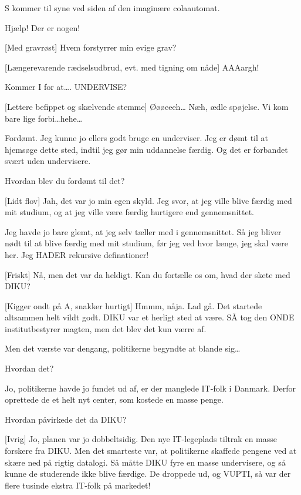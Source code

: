 \documentclass[danish]{article}
\begin{document}
\begin{sketch}
\scene S kommer til syne ved siden af den imaginære colaautomat.

 Hjælp! Der er nogen! 

[Med gravrøst] Hvem forstyrrer min evige grav?

[Længerevarende rædselsudbrud, evt. med tigning om nåde] AAAargh!

 Kommer I for at\ldots{}. UNDERVISE?

[Lettere befippet og skælvende stemme] Øøøeeeh\ldots{} Næh, ædle spøjelse.
    Vi kom bare lige forbi\ldots{}hehe\ldots{}

 Fordømt.  Jeg kunne jo ellers godt bruge en underviser. Jeg er dømt
   til at hjemsøge dette sted, indtil jeg gør min uddannelse færdig. Og det er
   forbandet svært uden undervisere.

 Hvordan blev du fordømt til det?

[Lidt flov] Jah, det var jo min egen skyld. Jeg svor, at jeg ville blive
   færdig med mit studium, og at jeg ville være færdig hurtigere end
   gennemsnittet.

   Jeg havde jo bare glemt, at jeg selv tæller med i gennemsnittet. Så jeg
   bliver nødt til at blive færdig med mit studium, før jeg ved hvor længe, jeg
   skal være her. Jeg HADER rekursive definationer!

[Friskt] Nå, men det var da heldigt. Kan du fortælle os om, hvad der
   skete med DIKU?

[Kigger ondt på A, snakker hurtigt] Hmmm, nåja. Lad gå. Det startede altsammen helt vildt
   godt. DIKU var et herligt sted at være. SÅ tog den ONDE institutbestyrer magten, men det blev det kun
   værre af.

   Men det værste var dengang, politikerne begyndte at blande sig\ldots{}

 Hvordan det?

 Jo, politikerne havde jo fundet ud af, er der manglede IT-folk i
   Danmark. Derfor oprettede de et helt nyt center, som kostede en masse penge.

 Hvordan påvirkede det da DIKU?

[Ivrig] Jo, planen var jo dobbeltsidig. Den nye IT-legeplads tiltrak en
   masse forskere fra DIKU. Men det smarteste var, at politikerne skaffede
   pengene ved at skære ned på rigtig datalogi. Så måtte DIKU fyre en masse
   undervisere, og så kunne de studerende ikke blive færdige. De droppede ud, og
   VUPTI, så var der flere tusinde ekstra IT-folk på markedet!


\end{sketch}
\end{document}
